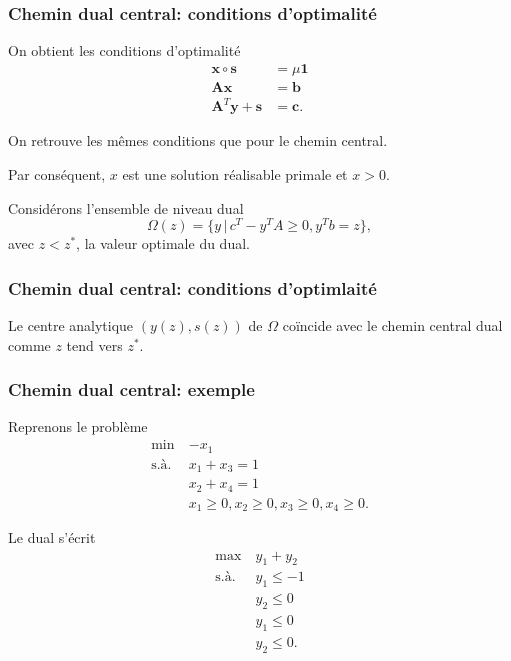 \documentclass[usepdftitle=false, aspectratio=169]{beamer}
\def\bb{\boldsymbol{b}}
\def\bc{\boldsymbol{c}}
\def\bs{\boldsymbol{s}}
\def\bx{\boldsymbol{x}}
\def\by{\boldsymbol{y}}
\def\bA{\boldsymbol{A}}
\def\bone{\boldsymbol{1}}
\begin{document}
\begin{frame}
\frametitle{Chemin dual central: conditions d'optimalité}

On obtient les conditions d'optimalité
\begin{align*}
\bx \circ \bs &= \mu \bone \\
\bA\bx &= \bb \\
\bA^T\by + \bs & = \bc.
\end{align*}

\mbox{}

On retrouve les mêmes conditions que pour le chemin central.

\mbox{}

Par conséquent, $x$ est une solution réalisable primale et $x > 0$.

\mbox{}

Considérons l'ensemble de niveau dual
\[
\Omega(z) = \lbrace y \,|\, c^T - y^T A \geq 0, y^T b = z\rbrace,
\]
avec $z < z^*$, la valeur optimale du dual.

\end{frame}

\begin{frame}
\frametitle{Chemin dual central: conditions d'optimlaité}

Le centre analytique $(y(z), s(z))$ de $\Omega$ coïncide avec le chemin central dual comme $z$ tend vers $z^*$.


\end{frame}

\begin{frame}
\frametitle{Chemin dual central: exemple}

Reprenons le problème
\begin{align*}
\min\ & -x_1 \\
\mbox{s.à. } & x_1 + x_3 = 1 \\
& x_2 + x_4 = 1 \\
& x_1 \geq 0, x_2 \geq 0, x_3 \geq 0, x_4 \geq 0.
\end{align*}

Le dual s'écrit
\begin{align*}
\max\ & y_1 + y_2 \\
\mbox{s.à. } & y_1 \leq -1 \\
& y_2 \leq 0 \\
& y_1 \leq 0 \\
& y_2 \leq 0.
\end{align*}

\end{frame}
\end{document}
